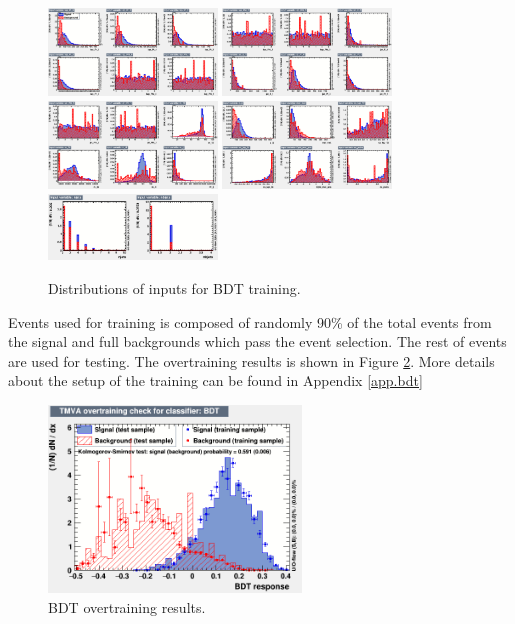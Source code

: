 \begin{figure}[h!]
	\caption{Distributions of inputs for BDT training.}
	\label{Fig.inputs}
	\centering
	\includegraphics[width=0.4\textwidth]{figures/4lbb/variables_id_c1.eps}
	\includegraphics[width=0.4\textwidth]{figures/4lbb/variables_id_c2.eps}
	\includegraphics[width=0.4\textwidth]{figures/4lbb/variables_id_c3.eps}
	\includegraphics[width=0.4\textwidth]{figures/4lbb/variables_id_c4.eps}
	\includegraphics[width=0.4\textwidth]{figures/4lbb/variables_id_c5.eps}
\end{figure}

Events used for training is composed of randomly 90\% of the total events from the signal  and full backgrounds which pass the event selection. The rest of events are used for testing. The overtraining results is shown in Figure \ref{Fig.overtraining}. More details about the setup of the training can be found in Appendix \ref{app.bdt}

\begin{figure}[h!]
	\caption{BDT overtraining results.}
	\label{Fig.overtraining}
	\centering
	\includegraphics[width=0.6\textwidth]{figures/4lbb/overtrain_BDT.png}
\end{figure}

